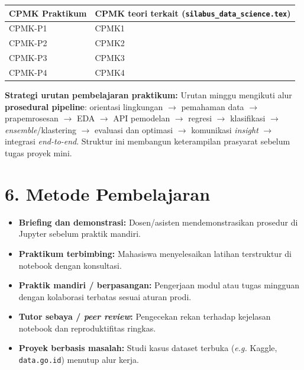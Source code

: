 \documentclass[12pt,a4paper]{article}
\begin{document}
\vspace{0.25cm}
{\small
\begin{tabular}{|l|l|}
\hline
\textbf{CPMK Praktikum} & \textbf{CPMK teori terkait (\texttt{silabus\_data\_science.tex})} \\
\hline
CPMK-P1 & CPMK1 \\
\hline
CPMK-P2 & CPMK2 \\
\hline
CPMK-P3 & CPMK3 \\
\hline
CPMK-P4 & CPMK4 \\
\hline
\end{tabular}
}

\vspace{0.45cm}

\noindent\textbf{Strategi urutan pembelajaran praktikum:} Urutan minggu mengikuti alur \textbf{prosedural pipeline}: orientasi lingkungan $\rightarrow$ pemahaman data $\rightarrow$ prapemrosesan $\rightarrow$ EDA $\rightarrow$ API pemodelan $\rightarrow$ regresi $\rightarrow$ klasifikasi $\rightarrow$ \textit{ensemble}/klastering $\rightarrow$ evaluasi dan optimasi $\rightarrow$ komunikasi \textit{insight} $\rightarrow$ integrasi \textit{end-to-end}. Struktur ini membangun keterampilan prasyarat sebelum tugas proyek mini.

\vspace{0.5cm}

\section*{6. Metode Pembelajaran}

\begin{itemize}[leftmargin=*]
  \item \textbf{Briefing dan demonstrasi:} Dosen/asisten mendemonstrasikan prosedur di Jupyter sebelum praktik mandiri.
  \item \textbf{Praktikum terbimbing:} Mahasiswa menyelesaikan latihan terstruktur di notebook dengan konsultasi.
  \item \textbf{Praktik mandiri / berpasangan:} Pengerjaan modul atau tugas mingguan dengan kolaborasi terbatas sesuai aturan prodi.
  \item \textbf{Tutor sebaya / \textit{peer review}:} Pengecekan rekan terhadap kejelasan notebook dan reproduktifitas ringkas.
  \item \textbf{Proyek berbasis masalah:} Studi kasus dataset terbuka (\textit{e.g.} Kaggle, \texttt{data.go.id}) menutup alur kerja.
\end{itemize}
\end{document}
